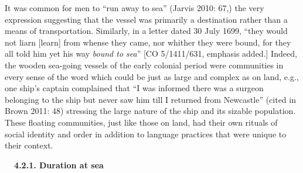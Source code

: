 \begin{styleStandard}
It was common for men to “run away to sea” (Jarvis 2010: 67,) the very expression suggesting that the vessel was primarily a destination rather than a means of transportation. Similarly, in a letter dated 30 July 1699, “they would not liarn [learn] from whense they came, nor whither they were bound, for they all told him yet his way \textit{bound to sea}” [CO 5/1411/631, emphasis added.] Indeed, the wooden sea-going vessels of the early colonial period were communities in every sense of the word which could be just as large and complex as on land, e.g., one ship’s captain complained that “I was informed there was a surgeon belonging to the ship but never saw him till I returned from Newcastle” (cited in Brown 2011: 48) stressing the large nature of the ship and its sizable population. These floating communities, just like those on land, had their own rituals of social identity and order in addition to language practices that were unique to their context.
\end{styleStandard}

\begin{styleStandard}
\textbf{\ \ 4.2.1. Duration at sea}
\end{styleStandard}

